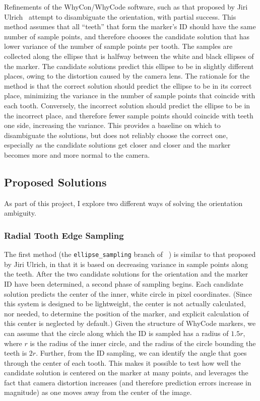 Refinements of the WhyCon/WhyCode software, such as that proposed by Jiri Ulrich~\cite{julrich_whycon} attempt to disambiguate
the orientation, with partial success.
This method assumes that all ``teeth'' that form the marker's ID should have the same number of sample points,
and therefore chooses the candidate solution that has lower variance of the number of sample points per tooth.
The samples are collected along the ellipse that is halfway between the white and black ellipses of the marker.
The candidate solutions predict this ellipse to be in slightly different places,
owing to the distortion caused by the camera lens.
The rationale for the method is that the correct solution should predict the ellipse to be in its correct place,
minimizing the variance in the number of sample points that coincide with each tooth.
Conversely, the incorrect solution should predict the ellipse to be in the incorrect place,
and therefore fewer sample points should coincide with teeth one side, increasing the variance.
This provides a baseline on which to disambiguate the solutions, but does not reliably choose the correct one,
especially as the candidate solutions get closer and closer and the marker becomes more and more normal to the camera.

\subsection{Proposed Solutions}

As part of this project, I explore two different ways of solving the orientation ambiguity.

\subsubsection{Radial Tooth Edge Sampling}

The first method (the \texttt{ellipse\_sampling} branch of ~\cite{uzgit_whycon}) is similar to that proposed by Jiri Ulrich,
in that it is based on decreasing variance in sample points along the teeth.
After the two candidate solutions for the orientation and the marker ID have been determined,
a second phase of sampling begins.
Each candidate solution predicts the center of the inner, white circle in pixel coordinates.
(Since this system is designed to be lightweight, the center is not actually calculated, nor needed, to determine the position of the marker,
and explicit calculation of this center is neglected by default.)
Given the structure of WhyCode markers, we can assume that the circle along which the ID is sampled
has a radius of $1.5r$, where $r$ is the radius of the inner circle, and the radius of the circle bounding the teeth is $2r$.
Further, from the ID sampling, we can identify the angle that goes through the center of each tooth.
This makes it possible to test how well the candidate solution is centered on the marker at many points,
and leverages the fact that camera distortion increases (and therefore prediction errors increase in magnitude) as one moves away from the center of the image.

